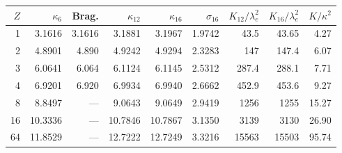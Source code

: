 \begin{tabular}{rrrrrrrrr}\toprule
$Z$ & $\kappa_6$ & Brag. & $\kappa_{12}$ & $\kappa_{16}$ & $\sigma_{16}$ & $K_{12}/\lambda_e^2$ & $K_{16}/\lambda_e^2$ & $K/\kappa^2$\\\midrule
1 & 3.1616 & 3.1616 & 3.1881 & 3.1967 & 1.9742 & 43.5 & 43.65 & 4.27 \\
2 & 4.8901 & 4.890 & 4.9242 & 4.9294 & 2.3283 & 147 & 147.4 & 6.07 \\
3 & 6.0641 & 6.064 & 6.1124 & 6.1145 & 2.5312 & 287.4 & 288.1 & 7.71 \\
4 & 6.9201 & 6.920 & 6.9934 & 6.9940 & 2.6662 & 452.9 & 453.6 & 9.27 \\
8 & 8.8497 & --- & 9.0643 & 9.0649 & 2.9419 & 1256 & 1255 & 15.27 \\
16 & 10.3336 & --- & 10.7846 & 10.7867 & 3.1350 & 3139 & 3130 & 26.90 \\
64 & 11.8529 & --- & 12.7222 & 12.7249 & 3.3216 & 15563 & 15503 & 95.74 \\
\bottomrule\end{tabular}
